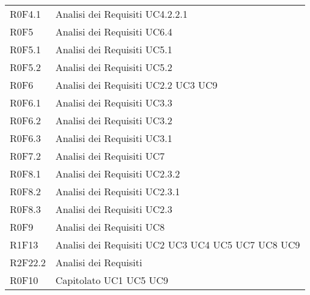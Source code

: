 \documentclass[../AnalisiDeiRequisiti.tex]{subfiles}
\begin{document}
\begin{longtable}{p{5cm}!{\VRule[1pt]}p{5cm}}
		\\
		R0F4.1 & Analisi dei Requisiti \newline UC4.2.2.1
		\\
		R0F5 & Analisi dei Requisiti \newline UC6.4
		\\
		R0F5.1 & Analisi dei Requisiti \newline UC5.1
		\\
		R0F5.2 & Analisi dei Requisiti \newline UC5.2
		\\
		R0F6 & Analisi dei Requisiti \newline UC2.2
		\newline UC3
		\newline UC9
		\\
		R0F6.1 & Analisi dei Requisiti \newline UC3.3
		\\
		R0F6.2 & Analisi dei Requisiti \newline UC3.2
		\\
		R0F6.3 & Analisi dei Requisiti \newline UC3.1
		\\
		R0F7.2 & Analisi dei Requisiti \newline UC7
		\\
		R0F8.1 & Analisi dei Requisiti \newline UC2.3.2
		\\
		R0F8.2 & Analisi dei Requisiti \newline UC2.3.1
		\\
		R0F8.3 & Analisi dei Requisiti \newline UC2.3
		\\
		R0F9 & Analisi dei Requisiti \newline UC8
		\\
		R1F13 & Analisi dei Requisiti \newline UC2
		\newline UC3
		\newline UC4
		\newline UC5
		\newline UC7
		\newline UC8
		\newline UC9
		\\
		R2F22.2 & Analisi dei Requisiti \\
		R0F10 & Capitolato \newline UC1
		\newline UC5
		\newline UC9

\end{longtable}
\end{document}
